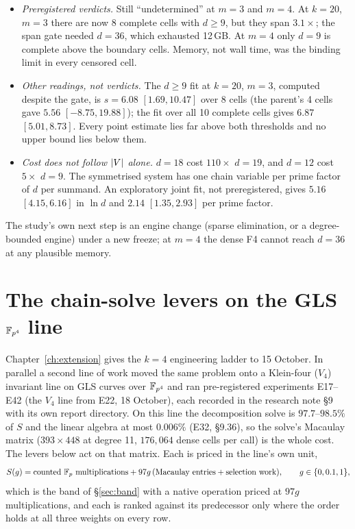 \begin{itemize}
\item \emph{Preregistered verdicts.} Still ``undetermined'' at $m=3$ and
  $m=4$. At $k=20$, $m=3$ there are now 8 complete cells with $d\ge9$, but
  they span $3.1\times$; the span gate needed $d=36$, which exhausted 12\,GB.
  At $m=4$ only $d=9$ is complete above the boundary cells. Memory, not
  wall time, was the binding limit in every censored cell.
\item \emph{Other readings, not verdicts.} The $d\ge9$ fit at $k=20$, $m=3$,
  computed despite the gate, is $s=6.08$ $[1.69,10.47]$ over 8 cells (the
  parent's 4 cells gave $5.56$ $[-8.75,19.88]$); the fit over all 10
  complete cells gives $6.87$ $[5.01,8.73]$. Every point estimate lies far
  above both thresholds and no upper bound lies below them.
\item \emph{Cost does not follow $\lvert V \rvert$ alone.} $d=18$ cost $110\times$
  $d=19$, and $d=12$ cost $5\times$ $d=9$. The symmetrised system has one
  chain variable per prime factor of $d$ per summand. An exploratory joint
  fit, not preregistered, gives $5.16$ $[4.15,6.16]$ in $\ln d$ and $2.14$
  $[1.35,2.93]$ per prime factor.
\end{itemize}
The study's own next step is an engine change (sparse elimination, or a
degree-bounded engine) under a new freeze; at $m=4$ the dense F4 cannot
reach $d=36$ at any plausible memory.

\section{The chain-solve levers on the GLS $\mathbb{F}_{p^4}$ line}\label{sec:fe-chain}

Chapter~\ref{ch:extension} gives the $k=4$ engineering ladder to 15 October.
In parallel a second line of work moved the same problem onto a
Klein-four ($V_4$) invariant line on GLS curves over $\mathbb{F}_{p^4}$ and ran
pre-registered experiments E17--E42 (the $V_4$ line from E22, 18 October), each recorded in the research note
\S9 with its own report directory. On this line the decomposition solve is
$97.7$--$98.5\%$ of $S$ and the linear algebra at most $0.006\%$
(E32, \S9.36), so the solve's Macaulay matrix ($393\times448$ at degree 11,
$176{,}064$ dense cells per call) is the whole cost. The levers below act on
that matrix. Each is priced in the line's own unit,
\[
  S(g)=\text{counted }\mathbb{F}_p\text{ multiplications}
  + 97g\,(\text{Macaulay entries}+\text{selection work}),\qquad g\in\{0,0.1,1\},
\]
which is the band of \S\ref{sec:band} with a native operation priced at
$97g$ multiplications, and each is ranked against its predecessor only where
the order holds at all three weights on every row.

